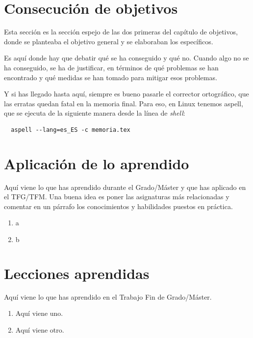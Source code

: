 \documentclass[a4paper, 12pt]{book}
\begin{document}
\section{Consecución de objetivos}
\label{sec:consecucion-objetivos}

Esta sección es la sección espejo de las dos primeras del capítulo de objetivos, donde se planteaba el objetivo general y se elaboraban los específicos.

Es aquí donde hay que debatir qué se ha conseguido y qué no. 
Cuando algo no se ha conseguido, se ha de justificar, en términos de qué problemas se han encontrado y qué medidas se han tomado para mitigar esos problemas.

Y si has llegado hasta aquí, siempre es bueno pasarle el corrector ortográfico, que las erratas quedan fatal en la memoria final.
Para eso, en Linux tenemos aspell, que se ejecuta de la siguiente manera desde la línea de \emph{shell}:

\begin{verbatim}
  aspell --lang=es_ES -c memoria.tex
\end{verbatim}

\section{Aplicación de lo aprendido}
\label{sec:aplicacion}

Aquí viene lo que has aprendido durante el Grado/Máster y que has aplicado en el TFG/TFM.
Una buena idea es poner las asignaturas más relacionadas y comentar en un párrafo los conocimientos y habilidades puestos en práctica.

\begin{enumerate}
  \item a
  \item b
\end{enumerate}


\section{Lecciones aprendidas}
\label{sec:lecciones_aprendidas}

Aquí viene lo que has aprendido en el Trabajo Fin de Grado/Máster.

\begin{enumerate}
  \item Aquí viene uno.
  \item Aquí viene otro.
\end{enumerate}
\end{document}
